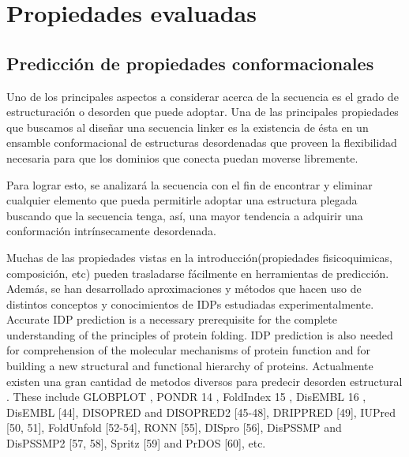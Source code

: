 \chapter{Propiedades evaluadas}
\label{tools}

\section{Predicción de propiedades conformacionales} \label{propiedadesConformacionales}





Uno de los principales aspectos a considerar acerca de la secuencia es el grado de estructuración o desorden que puede adoptar. 
Una de las principales propiedades que buscamos al diseñar una secuencia linker es la existencia de ésta en un ensamble conformacional 
de estructuras desordenadas que proveen la flexibilidad necesaria para que los dominios que conecta puedan moverse libremente.

Para lograr esto, se analizará la secuencia con el fin de encontrar y eliminar cualquier elemento que pueda permitirle adoptar una estructura plegada
buscando que la secuencia tenga, así, una mayor tendencia a adquirir una conformación intrínsecamente desordenada.



Muchas de las propiedades vistas en la introducción(propiedades fisicoquimicas, composición, etc) pueden trasladarse fácilmente en herramientas de predicción.
Además, se han desarrollado aproximaciones y métodos que hacen uso de distintos conceptos y conocimientos de IDPs estudiadas experimentalmente.
Accurate IDP prediction is a necessary prerequisite for the complete understanding of the principles of protein folding. IDP prediction is also needed for comprehension of the molecular mechanisms of protein function and
for building a new structural and functional hierarchy of proteins.
Actualmente existen una gran cantidad de metodos diversos para predecir desorden estructural \cite{he2009predicting}.
These include GLOBPLOT \cite{linding2003globplot}, PONDR 14 , FoldIndex 15 , DisEMBL 16 ,  DisEMBL [44], DISOPRED and DISOPRED2 [45-48],
DRIPPRED [49], IUPred [50, 51], FoldUnfold [52-54], RONN [55], DISpro [56], DisPSSMP and DisPSSMP2 [57, 58], Spritz [59] and PrDOS [60], etc.

